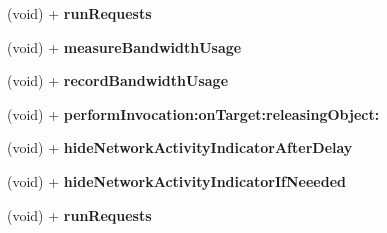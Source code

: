 \begin{DoxyCompactItemize}
\item 
\hypertarget{interface_a_s_i_h_t_t_p_request_07_08_a3948708d5250dec349a05e2d5d943ba0}{
(void) + {\bfseries run\-Requests}}
\label{interface_a_s_i_h_t_t_p_request_07_08_a3948708d5250dec349a05e2d5d943ba0}

\item 
\hypertarget{interface_a_s_i_h_t_t_p_request_07_08_ae002cae4049589d09b529b25d0a4df61}{
(void) + {\bfseries measure\-Bandwidth\-Usage}}
\label{interface_a_s_i_h_t_t_p_request_07_08_ae002cae4049589d09b529b25d0a4df61}

\item 
\hypertarget{interface_a_s_i_h_t_t_p_request_07_08_a9bfa27b53cfee20fcb4353aaa1fe015b}{
(void) + {\bfseries record\-Bandwidth\-Usage}}
\label{interface_a_s_i_h_t_t_p_request_07_08_a9bfa27b53cfee20fcb4353aaa1fe015b}

\item 
\hypertarget{interface_a_s_i_h_t_t_p_request_07_08_ac5f0757b7a71e70cee7a93dd7e9ee9f8}{
(void) + {\bfseries perform\-Invocation\-:on\-Target\-:releasing\-Object\-:}}
\label{interface_a_s_i_h_t_t_p_request_07_08_ac5f0757b7a71e70cee7a93dd7e9ee9f8}

\item 
\hypertarget{interface_a_s_i_h_t_t_p_request_07_08_a8b784d38e3706dbbce3d956bfe8c4d11}{
(void) + {\bfseries hide\-Network\-Activity\-Indicator\-After\-Delay}}
\label{interface_a_s_i_h_t_t_p_request_07_08_a8b784d38e3706dbbce3d956bfe8c4d11}

\item 
\hypertarget{interface_a_s_i_h_t_t_p_request_07_08_a60cd7d715f73401f380a650c2257d32b}{
(void) + {\bfseries hide\-Network\-Activity\-Indicator\-If\-Neeeded}}
\label{interface_a_s_i_h_t_t_p_request_07_08_a60cd7d715f73401f380a650c2257d32b}

\item 
\hypertarget{interface_a_s_i_h_t_t_p_request_07_08_a3948708d5250dec349a05e2d5d943ba0}{
(void) + {\bfseries run\-Requests}}
\label{interface_a_s_i_h_t_t_p_request_07_08_a3948708d5250dec349a05e2d5d943ba0}

\end{DoxyCompactItemize}
